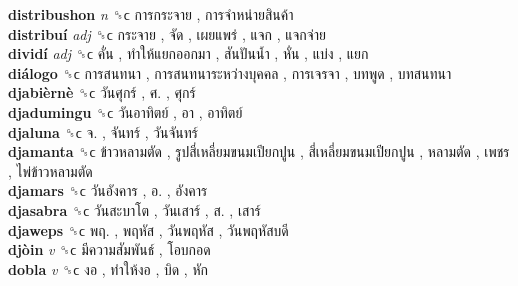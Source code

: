 \textbf{distribushon} \emph{n}  ␝ϲ   การกระจาย ,  การจำหน่ายสินค้า   \\
\textbf{distribuí} \emph{adj}  ␝ϲ   กระจาย ,  จัด ,  เผยแพร่ ,  แจก ,  แจกจ่าย   \\
\textbf{dividí} \emph{adj}  ␝ϲ   คั่น ,  ทำให้แยกออกมา ,  สันปันน้ำ ,  หั่น ,  แบ่ง ,  แยก   \\
\textbf{diálogo} ␝ϲ   การสนทนา ,  การสนทนาระหว่างบุคคล ,  การเจรจา ,  บทพูด ,  บทสนทนา   \\
\textbf{djabièrnè} ␝ϲ   วันศุกร์ ,  ศ. ,  ศุกร์   \\
\textbf{djadumingu} ␝ϲ   วันอาทิตย์ ,  อา ,  อาทิตย์   \\
\textbf{djaluna} ␝ϲ   จ. ,  จันทร์ ,  วันจันทร์   \\
\textbf{djamanta} ␝ϲ   ข้าวหลามตัด ,  รูปสี่เหลี่ยมขนมเปียกปูน ,  สี่เหลี่ยมขนมเปียกปูน ,  หลามตัด ,  เพชร ,  ไพ่ข้าวหลามตัด   \\
\textbf{djamars} ␝ϲ   วันอังคาร ,  อ. ,  อังคาร   \\
\textbf{djasabra} ␝ϲ   วันสะบาโต ,  วันเสาร์ ,  ส. ,  เสาร์   \\
\textbf{djaweps} ␝ϲ   พฤ. ,  พฤหัส ,  วันพฤหัส ,  วันพฤหัสบดี   \\
\textbf{djòin} \emph{v}  ␝ϲ   มีความสัมพันธ์ ,  โอบกอด   \\
\textbf{dobla} \emph{v}  ␝ϲ   งอ ,  ทำให้งอ ,  บิด ,  หัก   \\
